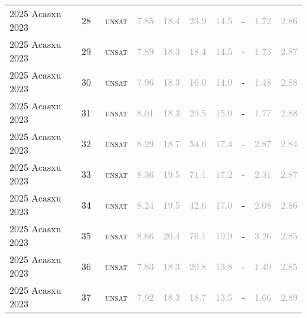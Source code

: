 \begin{center}
{\begin{longtable}{@{}llllllllll@{}}
2025 Acasxu 2023 & 28 & ~\textsc{unsat} & \textcolor{darkgray}{7.85} & \textcolor{darkgray}{18.4} & \textcolor{darkgray}{23.9} & \textcolor{darkgray}{14.5} & - & \textcolor{darkgray}{1.72} & \textcolor{darkgray}{2.86} \\
2025 Acasxu 2023 & 29 & ~\textsc{unsat} & \textcolor{darkgray}{7.89} & \textcolor{darkgray}{18.3} & \textcolor{darkgray}{18.4} & \textcolor{darkgray}{14.5} & - & \textcolor{darkgray}{1.73} & \textcolor{darkgray}{2.87} \\
2025 Acasxu 2023 & 30 & ~\textsc{unsat} & \textcolor{darkgray}{7.96} & \textcolor{darkgray}{18.3} & \textcolor{darkgray}{16.0} & \textcolor{darkgray}{14.0} & - & \textcolor{darkgray}{1.48} & \textcolor{darkgray}{2.88} \\
2025 Acasxu 2023 & 31 & ~\textsc{unsat} & \textcolor{darkgray}{8.01} & \textcolor{darkgray}{18.3} & \textcolor{darkgray}{29.5} & \textcolor{darkgray}{15.0} & - & \textcolor{darkgray}{1.77} & \textcolor{darkgray}{2.88} \\
2025 Acasxu 2023 & 32 & ~\textsc{unsat} & \textcolor{darkgray}{8.29} & \textcolor{darkgray}{18.7} & \textcolor{darkgray}{54.6} & \textcolor{darkgray}{17.4} & - & \textcolor{darkgray}{2.87} & \textcolor{darkgray}{2.84} \\
2025 Acasxu 2023 & 33 & ~\textsc{unsat} & \textcolor{darkgray}{8.36} & \textcolor{darkgray}{19.5} & \textcolor{darkgray}{71.1} & \textcolor{darkgray}{17.2} & - & \textcolor{darkgray}{2.31} & \textcolor{darkgray}{2.87} \\
2025 Acasxu 2023 & 34 & ~\textsc{unsat} & \textcolor{darkgray}{8.24} & \textcolor{darkgray}{19.5} & \textcolor{darkgray}{42.6} & \textcolor{darkgray}{17.0} & - & \textcolor{darkgray}{2.08} & \textcolor{darkgray}{2.86} \\
2025 Acasxu 2023 & 35 & ~\textsc{unsat} & \textcolor{darkgray}{8.66} & \textcolor{darkgray}{20.4} & \textcolor{darkgray}{76.1} & \textcolor{darkgray}{19.9} & - & \textcolor{darkgray}{3.26} & \textcolor{darkgray}{2.85} \\
2025 Acasxu 2023 & 36 & ~\textsc{unsat} & \textcolor{darkgray}{7.83} & \textcolor{darkgray}{18.3} & \textcolor{darkgray}{20.8} & \textcolor{darkgray}{13.8} & - & \textcolor{darkgray}{1.49} & \textcolor{darkgray}{2.85} \\
2025 Acasxu 2023 & 37 & ~\textsc{unsat} & \textcolor{darkgray}{7.92} & \textcolor{darkgray}{18.3} & \textcolor{darkgray}{18.7} & \textcolor{darkgray}{13.5} & - & \textcolor{darkgray}{1.66} & \textcolor{darkgray}{2.89} \\

\end{longtable}}
\end{center}
